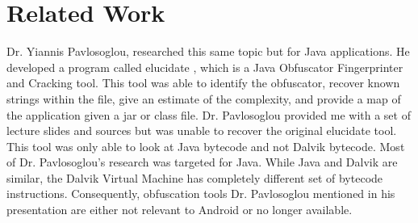 \section{Related Work}
Dr. Yiannis Pavlosoglou, researched this same topic but for Java applications. He developed a program called elucidate \cite{elucidate}, which is a Java Obfuscator Fingerprinter and Cracking tool. This tool was able to identify the obfuscator, recover known strings within the file, give an estimate of the complexity, and provide a map of the application given a jar or class file. Dr. Pavlosoglou provided me with a set of lecture slides and sources but was unable to recover the original elucidate tool. This tool was only able to look at Java bytecode and not Dalvik bytecode. Most of Dr. Pavlosoglou's research was targeted for Java. While Java and Dalvik are similar, the Dalvik Virtual Machine has completely different set of bytecode instructions. Consequently, obfuscation tools Dr. Pavlosoglou mentioned in his presentation are either not relevant to Android or no longer available.

